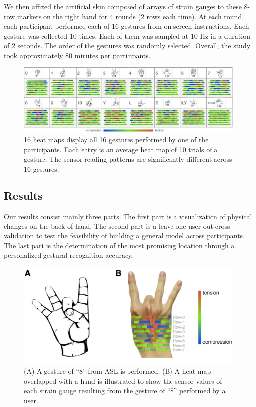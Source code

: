 \documentclass{sigchi}
\begin{document}
We then affixed the artificial skin composed of arrays of strain gauges to these 8-row markers on the right hand for 4 rounds (2 rows each time). At each round, each participant performed each of 16 gestures from on-screen instructions. Each gesture was collected 10 times. Each of them was sampled at 10 Hz in a duration of 2 seconds.
The order of the gestures was randomly selected. 
Overall, the study took approximately 80 minutes per participants.

\vspace{10mm}

\begin{figure}[t]
 \begin{center}
  \includegraphics[width=2\columnwidth]{figures/user16GesturesSV_v3.pdf}
  \caption{ 16 heat maps display all 16 gestures performed by one of the participants. Each entry is an average heat map of 10 trials of a gesture. The sensor reading patterns are significantly different across 16 gestures.
  }
  \label{fig:user16GesturesSV}
  \end{center}
\end{figure}

\subsection{Results}

Our results consist mainly three parts. The first part is a visualization of physical changes on the back of hand. The second part is a leave-one-user-out cross validation to test the feasibility of building a general model across participants. The last part is the determination of the most promising location through a personalized gestural recognition accuracy.

\begin{figure}[t]
 \begin{center}
  \includegraphics[width=0.9\columnwidth]{figures/Num8GestureV4.pdf}
  \caption{
    (A) A gesture of ``8'' from ASL is performed.
    (B) A heat map overlapped with a hand is illustrated to show the sensor values of each strain gauge resulting from the gesture of ``8'' performed by a user.
  }
  \label{fig:Num8Gesture}
  \end{center}
\end{figure}
\end{document}
